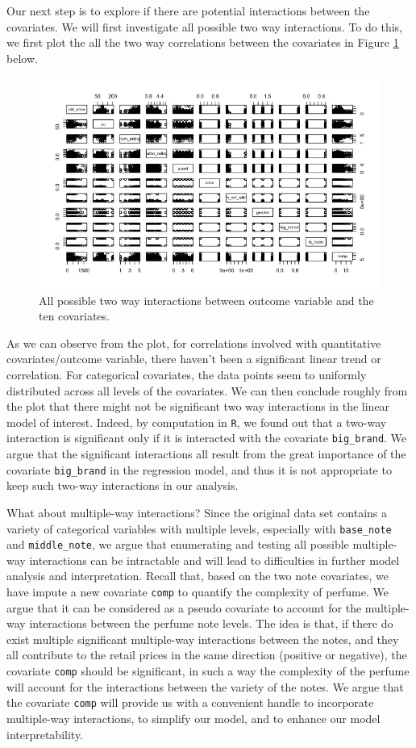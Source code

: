 \documentclass[12pt]{amsart}
\begin{document}
Our next step is to explore if there are potential interactions between the covariates. We will first investigate all possible two way interactions. To do this, we first plot the all the two way correlations between the covariates in Figure \ref{fig2} below. 
\begin{figure}[H]
    \centering
    \includegraphics[width = \linewidth]{423f2.jpg}
    \caption{All possible two way interactions between outcome variable and the ten covariates.}
    \label{fig2}
\end{figure}
As we can observe from the plot, for correlations involved with quantitative covariates/outcome variable, there haven't been a significant linear trend or correlation. For categorical covariates, the data points seem to uniformly distributed across all levels of the covariates. We can then conclude roughly from the plot that there might not be significant two way interactions in the linear model of interest. Indeed, by computation in \texttt{R}, we found out that a two-way interaction is significant only if it is interacted with the covariate \texttt{big\_brand}. We argue that the significant interactions all result from the great importance of the covariate \texttt{big\_brand} in the regression model, and thus it is not appropriate to keep such two-way interactions in our analysis.

What about multiple-way interactions? Since the original data set contains a variety of categorical variables with multiple levels, especially with \texttt{base\_note} and \texttt{middle\_note}, we argue that enumerating and testing all possible multiple-way interactions can be intractable and will lead to difficulties in further model analysis and interpretation. Recall that, based on the two note covariates, we have impute a new covariate \texttt{comp} to quantify the complexity of perfume. We argue that it can be considered as a pseudo covariate to account for the multiple-way interactions between the perfume note levels. The idea is that, if there do exist multiple significant multiple-way interactions between the notes, and they all contribute to the retail prices in the same direction (positive or negative), the covariate \texttt{comp} should be significant, in such a way the complexity of the perfume will account for the interactions between the variety of the notes. We argue that the covariate \texttt{comp} will provide us with a convenient handle to incorporate multiple-way interactions, to simplify our model, and to enhance our model interpretability. 
\end{document}
